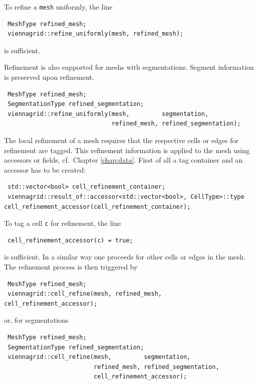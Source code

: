  To refine a \lstinline|mesh| uniformly, the line
 \begin{lstlisting}
 MeshType refined_mesh;
 viennagrid::refine_uniformly(mesh, refined_mesh);
 \end{lstlisting}
 is sufficient.

 Refinement is also supported for meshs with segmentations. Segment information is preserved upon refinement.
 \begin{lstlisting}
 MeshType refined_mesh;
 SegmentationType refined_segmentation;
 viennagrid::refine_uniformly(mesh,         segmentation,
                              refined_mesh, refined_segmentation);
 \end{lstlisting}

 The local refinement of a mesh requires that the respective cells or edges for refinement are tagged. This refinement information is applied to the mesh using accessors or fields, cf.~Chapter \ref{chap:data}.
 First of all a tag container and an accessor has to be created:
 \begin{lstlisting}
 std::vector<bool> cell_refinement_container;
 viennagrid::result_of::accessor<std::vector<bool>, CellType>::type cell_refinement_accessor(cell_refinement_container);
 \end{lstlisting}


 To tag a cell \lstinline|c| for refinement, the line
 \begin{lstlisting}
 cell_refinement_accessor(c) = true;
 \end{lstlisting}
 is sufficient. In a similar way one proceeds for other cells or edges in the mesh. The refinement process is then triggered by
 \begin{lstlisting}
 MeshType refined_mesh;
 viennagrid::cell_refine(mesh, refined_mesh, cell_refinement_accessor);
 \end{lstlisting}

 \pagebreak

 or, for segmentations
 \begin{lstlisting}
 MeshType refined_mesh;
 SegmentationType refined_segmentation;
 viennagrid::cell_refine(mesh,         segmentation,
                         refined_mesh, refined_segmentation,
                         cell_refinement_accessor);
 \end{lstlisting}


